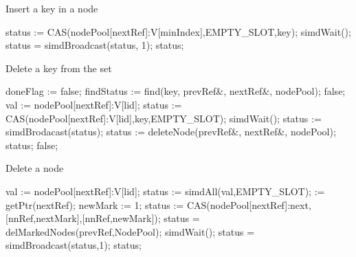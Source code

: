 \documentclass[11pt,onecolumn]{IEEEtran}
\begin{document}
\begin{algorithm}
  \caption{Insert a key in a node}
  \label{alg:inskey}
  \begin{algorithmic}[5]  
        \State status := CAS(nodePool[nextRef]:V[minIndex],EMPTY\_SLOT,key);
      \EndIf
      \State simdWait();
      \State status = simdBroadcast(status, 1);
      \Return status;
    \EndFunction
  \end{algorithmic}
\end{algorithm}

\begin{algorithm}
  \caption{Delete a key from the set}
  \label{alg:delkey}
  \begin{algorithmic}[5]  
      \State doneFlag := false;
        \State findStatus := find(key, prevRef\&, nextRef\&, nodePool);
          \State
          \Return false;
        \EndIf
        \State val   := nodePool[nextRef]:V[lid];
          \State status := CAS(nodePool[nextRef]:V[lid],key,EMPTY\_SLOT);
        \EndIf
        \State simdWait();
        \State status := simdBrodacast(status);
          \State status := deleteNode(prevRef\&, nextRef\&, nodePool);
          \Return status;
        \Else
          \State
          \Return false;
        \EndIf
      \EndWhile
    \EndFunction
  \end{algorithmic}
\end{algorithm}

\begin{algorithm}
  \caption{Delete a node}
  \label{alg:delnode}
  \begin{algorithmic}[5]  
         \State val := nodePool[nextRef]:V[lid];
         \State status := simdAll(val,EMPTY\_SLOT);
            := getPtr(nextRef);
           \State newMark := 1;
              \State status := CAS(nodePool[nextRef]:next,[nnRef,nextMark],[nnRef,newMark]);
                \State status = delMarkedNodes(prevRef,NodePool); 
              \EndIf
           \EndIf
           \State simdWait();
           \State status = simdBroadcast(status,1);
           \State
           \Return status;
         \EndIf
    \EndFunction
  \end{algorithmic}
\end{algorithm}

%


\end{document}
